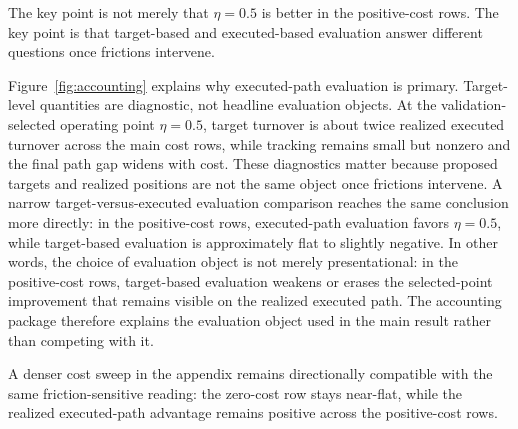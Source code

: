 \documentclass[10pt,twocolumn]{article}
\begin{document}
\begin{table}[t]
\centering
\small
\resizebox{\columnwidth}{!}{}
\caption{Held-out executed-path comparison for the frozen-policy selected operating point. With predictive information held fixed, the validation-selected interior point $\eta=0.5$ is compared against the immediate-execution baseline $\eta=1.0$ on $\kappa\in\{0, 5\times10^{-4}, 10^{-3}\}$, showing positive-cost gains with a large reduction in executed turnover while the zero-cost row remains near-flat. The paired-median delta is computed on aligned seed-level outcomes and therefore need not equal the arithmetic difference between the displayed marginal medians. This is the paper's only main empirical result, because it isolates how the forecast-to-execution interface changes realized decision quality under frictions.}
\label{tab:rl-main}
\end{table}

The key point is not merely that $\eta=0.5$ is better in the positive-cost rows. The key point is that target-based and executed-based evaluation answer different questions once frictions intervene.

Figure~\ref{fig:accounting} explains why executed-path evaluation is primary. Target-level quantities are diagnostic, not headline evaluation objects. At the validation-selected operating point $\eta=0.5$, target turnover is about twice realized executed turnover across the main cost rows, while tracking remains small but nonzero and the final path gap widens with cost. These diagnostics matter because proposed targets and realized positions are not the same object once frictions intervene. A narrow target-versus-executed evaluation comparison reaches the same conclusion more directly: in the positive-cost rows, executed-path evaluation favors $\eta=0.5$, while target-based evaluation is approximately flat to slightly negative. In other words, the choice of evaluation object is not merely presentational: in the positive-cost rows, target-based evaluation weakens or erases the selected-point improvement that remains visible on the realized executed path. The accounting package therefore explains the evaluation object used in the main result rather than competing with it.

A denser cost sweep in the appendix remains directionally compatible with the same friction-sensitive reading: the zero-cost row stays near-flat, while the realized executed-path advantage remains positive across the positive-cost rows.
\end{document}
